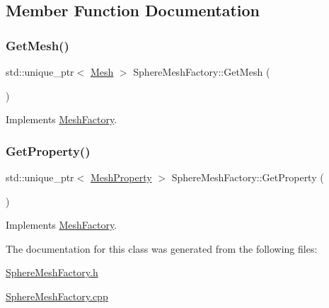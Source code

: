\subsection{Member Function Documentation}
\mbox{\label{class_sphere_mesh_factory_a1af7ab44a55adea946466d4729cb2b52}} 
\subsubsection{\texorpdfstring{GetMesh()}{GetMesh()}}
{\footnotesize\ttfamily std\+::unique\+\_\+ptr$<$ \mbox{\hyperlink{class_mesh}{Mesh}} $>$ Sphere\+Mesh\+Factory\+::\+Get\+Mesh (\begin{DoxyParamCaption}{ }\end{DoxyParamCaption})\hspace{0.3cm}{\ttfamily [virtual]}}



Implements \mbox{\hyperlink{class_mesh_factory_a4cc58b609d0f4f5209cf5245e16f0720}{Mesh\+Factory}}.

\mbox{\label{class_sphere_mesh_factory_af19b3922356cc71d20213556b0eb98a6}} 
\subsubsection{\texorpdfstring{GetProperty()}{GetProperty()}}
{\footnotesize\ttfamily std\+::unique\+\_\+ptr$<$ \mbox{\hyperlink{class_mesh_property}{Mesh\+Property}} $>$ Sphere\+Mesh\+Factory\+::\+Get\+Property (\begin{DoxyParamCaption}{ }\end{DoxyParamCaption})\hspace{0.3cm}{\ttfamily [virtual]}}



Implements \mbox{\hyperlink{class_mesh_factory_abff50d215458843dd98271ab803a7671}{Mesh\+Factory}}.



The documentation for this class was generated from the following files\+:\begin{DoxyCompactItemize}
\item 
\mbox{\hyperlink{_sphere_mesh_factory_8h}{Sphere\+Mesh\+Factory.\+h}}\item 
\mbox{\hyperlink{_sphere_mesh_factory_8cpp}{Sphere\+Mesh\+Factory.\+cpp}}\end{DoxyCompactItemize}
